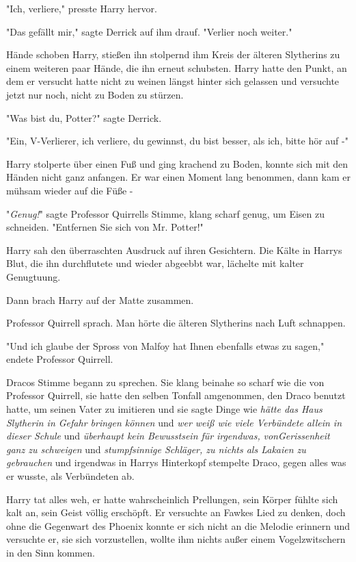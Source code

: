 {"Ich, verliere," presste Harry hervor.

"Das gefällt mir," sagte Derrick auf ihm drauf. "Verlier noch weiter."

\later

Hände schoben Harry, stießen ihn stolpernd ihm Kreis der älteren Slytherins zu einem weiteren paar Hände, die ihn erneut schubsten. Harry hatte den Punkt, an dem er versucht hatte nicht zu weinen längst hinter sich gelassen und versuchte jetzt nur noch, nicht zu Boden zu stürzen.

"Was bist du, Potter?" sagte Derrick.

"Ein, V-Verlierer, ich verliere, du gewinnst, du bist besser, als ich, bitte hör auf -"

Harry stolperte über einen Fuß und ging krachend zu Boden, konnte sich mit den Händen nicht ganz anfangen. Er war einen Moment lang benommen, dann kam er mühsam wieder auf die Füße -

"\emph{Genug!}" sagte Professor Quirrells Stimme, klang scharf genug, um Eisen zu schneiden. "Entfernen Sie sich von Mr. Potter!"

Harry sah den überraschten Ausdruck auf ihren Gesichtern. Die Kälte in Harrys Blut, die ihn durchflutete und wieder abgeebbt war, lächelte mit kalter Genugtuung.

Dann brach Harry auf der Matte zusammen.

Professor Quirrell sprach. Man hörte die älteren Slytherins nach Luft schnappen.

"Und ich glaube der Spross von Malfoy hat Ihnen ebenfalls etwas zu sagen," endete Professor Quirrell.

Dracos Stimme begann zu sprechen. Sie klang beinahe so scharf wie die von Professor Quirrell, sie hatte den selben Tonfall amgenommen, den Draco benutzt hatte, um seinen Vater zu imitieren und sie sagte Dinge wie \emph{hätte das Haus Slytherin in Gefahr bringen können} und \emph{wer weiß wie viele Verbündete allein in dieser Schule} und \emph{überhaupt kein Bewusstsein für} \emph{irgendwas,} \emph{vonGerissenheit ganz zu schweigen} und \emph{stumpfsinnige Schläger, zu nichts als Lakaien zu gebrauchen} und irgendwas in Harrys Hinterkopf stempelte Draco, gegen alles was er wusste, als Verbündeten ab.

Harry tat alles weh, er hatte wahrscheinlich Prellungen, sein Körper fühlte sich kalt an, sein Geist völlig erschöpft. Er versuchte an Fawkes Lied zu denken, doch ohne die Gegenwart des Phoenix konnte er sich nicht an die Melodie erinnern und versuchte er, sie sich vorzustellen, wollte ihm nichts außer einem Vogelzwitschern in den Sinn kommen.

}
